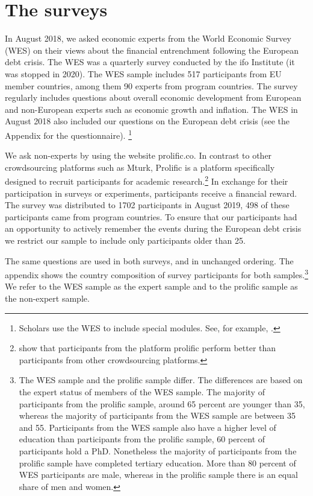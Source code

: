 \section{The surveys }
In August 2018, we asked economic experts from the World
Economic Survey (WES) on their views about the financial
entrenchment following the European debt crisis. The WES was a quarterly
survey conducted by the ifo Institute (it was stopped in 2020). The WES sample includes 517
participants from EU member countries, among them 90 experts from program countries.
The survey regularly includes questions about overall economic development
from European and non-European experts such as economic growth and
inflation. The WES in August 2018 also included our
questions on the European debt crisis (see the Appendix for the
questionnaire). \footnote{Scholars use the WES to include special modules. See, for example, \cite{mosler}.}

We ask non-experts by using the website
prolific.co. In contrast to other crowdsourcing platforms such as Mturk,
Prolific is a platform specifically designed to recruit participants for
academic research.\footnote{\cite{Peer} show that participants from
the platform prolific perform better than participants from other
crowdsourcing platforms.} In exchange for their participation in surveys or
experiments, participants receive a financial reward. The survey was
distributed to 1702 participants in August 2019, 498 of these participants
came from program countries. To ensure that our participants had an
opportunity to actively remember the events during the European debt crisis
we restrict our sample to include only participants older than 25.

The same questions are used in both surveys, and in
unchanged ordering. The appendix shows the country composition of survey
participants for both samples.\footnote{%
The WES sample and the prolific sample differ. The differences are based on the expert status of members
of the WES sample. The majority of participants from the prolific sample,
around 65 percent are younger than 35, whereas the majority of participants
from the WES sample are between 35 and 55. Participants from the WES sample
also have a higher level of education than participants from the
prolific sample, 60 percent of participants hold a PhD. Nonetheless the
majority of participants from the prolific sample have completed tertiary
education. More than 80 percent of WES participants are male, whereas in the
prolific sample there is an equal share of men and women.} We refer to the
WES sample as the expert sample and to the prolific sample as the non-expert
sample. 